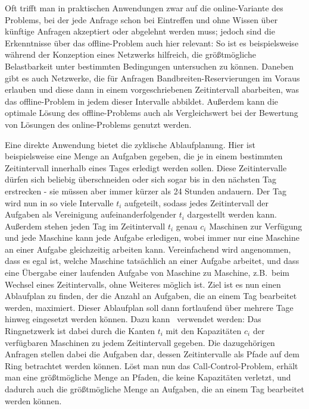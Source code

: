 Oft trifft man in praktischen Anwendungen zwar auf die online-Variante des Problems, bei der jede Anfrage schon bei Eintreffen und
ohne Wissen über künftige Anfragen akzeptiert oder abgelehnt werden muss;
jedoch sind die Erkenntnisse über das offline-Problem auch hier relevant:
So ist es beispielsweise während der Konzeption eines Netzwerks hilfreich, die größtmögliche Belastbarkeit unter bestimmten 
Bedingungen untersuchen zu können.
Daneben gibt es auch Netzwerke, die für Anfragen Bandbreiten-Reservierungen im Voraus erlauben und diese dann in einem 
vorgeschriebenen Zeitintervall abarbeiten, was das offline-Problem in jedem dieser Intervalle abbildet.
Außerdem kann die optimale Lösung des offline-Problems auch als Vergleichswert bei der Bewertung von Lösungen des
online-Problems genutzt werden.

Eine direkte Anwendung bietet die zyklische Ablaufplanung.
Hier ist beispielsweise eine Menge an Aufgaben gegeben, die je in einem bestimmten Zeitintervall innerhalb eines Tages erledigt werden sollen.
Diese Zeitintervalle dürfen sich beliebig überschneiden oder sich sogar bis in den nächsten Tag erstrecken - sie müssen aber immer kürzer 
als 24 Stunden andauern.
Der Tag wird nun in so viele Intervalle $t_i$ aufgeteilt, sodass jedes Zeitintervall der Aufgaben als Vereinigung  
aufeinanderfolgender $t_i$ dargestellt werden kann.
Außerdem stehen jeden Tag im Zeitintervall $t_i$ genau $c_i$ Maschinen zur Verfügung und jede Maschine kann jede Aufgabe erledigen, wobei immer nur 
eine Maschine an einer Aufgabe gleichzeitig arbeiten kann.
Vereinfachend wird angenommen, dass es egal ist, welche Maschine tatsächlich an einer Aufgabe arbeitet, und dass eine Übergabe einer laufenden
Aufgabe von Maschine zu Maschine, z.B.\ beim Wechsel eines Zeitintervalls, ohne Weiteres möglich ist.
Ziel ist es nun einen Ablaufplan zu finden, der die Anzahl an Aufgaben, die an einem Tag bearbeitet werden, maximiert.
Dieser Ablaufplan soll dann fortlaufend über mehrere Tage hinweg eingesetzt werden können.
Dazu kann \CallControl\ verwendet werden: Das Ringnetzwerk ist dabei durch die Kanten $t_i$ mit den Kapazitäten $c_i$ der verfügbaren Maschinen
zu jedem Zeitintervall gegeben. Die dazugehörigen Anfragen stellen dabei die Aufgaben dar, dessen Zeitintervalle als Pfade auf dem Ring betrachtet
werden können.
Löst man nun das Call-Control-Problem, erhält man eine größtmögliche Menge an Pfaden, die keine Kapazitäten verletzt, und dadurch auch die
größtmögliche Menge an Aufgaben, die an einem Tag bearbeitet werden können.
